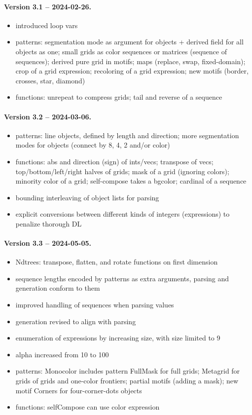 \documentclass[a4paper]{llncs}
\begin{document}
\paragraph{Version 3.1 -- 2024-02-26.}
\begin{itemize}
\item introduced loop vars
\item patterns: segmentation mode as argument for objects + derived field for all objects as one; small grids as color sequences or matrices (sequence of sequences); derived pure grid in motifs; maps (replace, swap, fixed-domain); crop of a grid expression; recoloring of a grid expression; new motifs (border, crosses, star, diamond)
\item functions: unrepeat to compress grids; tail and reverse of a sequence
\end{itemize}

\paragraph{Version 3.2 -- 2024-03-06.}
\begin{itemize}
\item patterns: line objects, defined by length and direction; more segmentation modes for objects (connect by 8, 4, 2 and/or color)
\item functions: abs and direction (sign) of ints/vecs; transpose of vecs; top/bottom/left/right halves of grids; mask of a grid (ignoring colors); minority color of a grid; self-compose takes a bgcolor; cardinal of a sequence
\item bounding interleaving of object lists for parsing
\item explicit conversions between different kinds of integers (expressions) to penalize thorough DL
\end{itemize}

\paragraph{Version 3.3 -- 2024-05-05.}
\begin{itemize}
\item Ndtrees: transpose, flatten, and rotate functions on first dimension
\item sequence lengths encoded by patterns as extra arguments, parsing and generation conform to them
\item improved handling of sequences when parsing values
\item generation revised to align with parsing
\item enumeration of expressions by increasing size, with size limited to 9
\item alpha increased from 10 to 100
\item patterns: Monocolor includes pattern FullMask for full grids; Metagrid for grids of grids and one-color frontiers; partial motifs (adding a mask); new motif Corners for four-corner-dots objects
\item functions: selfCompose can use color expression
\end{itemize}
\end{document}
